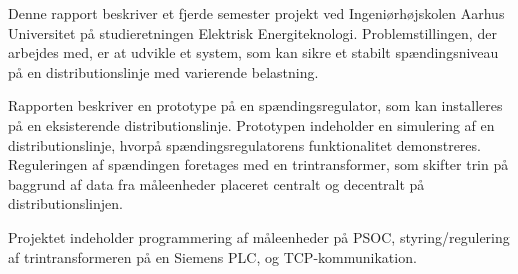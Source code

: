 
Denne rapport beskriver et fjerde semester projekt ved Ingeniørhøjskolen Aarhus Universitet på studieretningen Elektrisk Energiteknologi. Problemstillingen, der arbejdes med, er at udvikle et system, som kan sikre et stabilt spændingsniveau på en distributionslinje med varierende belastning.

Rapporten beskriver en prototype på en spændingsregulator, som kan installeres på en eksisterende distributionslinje. Prototypen indeholder en simulering af en distributionslinje, hvorpå spændingsregulatorens funktionalitet demonstreres. Reguleringen af spændingen foretages med en trintransformer, som skifter trin på baggrund af data fra måleenheder placeret centralt og decentralt på distributionslinjen.

Projektet indeholder programmering af måleenheder på PSOC, styring/regulering af trintransformeren på en Siemens PLC, og TCP-kommunikation. 